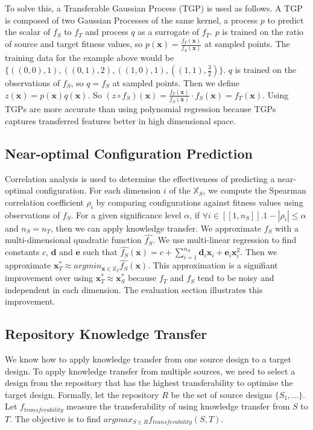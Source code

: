 \documentclass[10pt,a4paper]{article}
\newcommand{\dsb}[1]{[\![#1]\!]}
\begin{document}
To solve this, a Transferable Gaussian Process (TGP) is used as follows. A TGP is composed of two Gaussian Processes of the same kernel, a process $p$ to predict the scalar of $f_S$ to $f_T$ and process $q$ as a surrogate of $f_T$. $p$ is trained on the ratio of source and target fitness values, so $p(\mathbf{x})=\frac{f_T(\mathbf{x})}{f_S(\mathbf{x})}$ at sampled points. The training data for the example above would be $\{((0,0),1),((0,1),2),((1,0),1),\allowbreak((1,1),\frac{3}{2})\}$. $q$ is trained on the observations of $f_S$, so $q=f_S$ at sampled points. Then we define $z(\mathbf{x})=p(\mathbf{x})q(\mathbf{x})$. So $(z\circ f_S)(\mathbf{x})=\frac{f_T(\mathbf{x})}{f_S(\mathbf{x})}\cdot f_S(\mathbf{x})=f_T(\mathbf{x})$. Using TGPs are more accurate than using polynomial regression because TGPs captures transferred features better in high dimensional space.

\subsection{Near-optimal Configuration Prediction}
Correlation analysis is used to determine the effectiveness of predicting a near-optimal configuration. For each dimension $i$ of the $\mathbb{X}_S$, we compute the Spearman correlation coefficient $\rho_i$ by comparing configurations against fitness values using observations of $f_S$. For a given significance level $\alpha$, if $\forall i\in\dsb{1,n_S}.1-|\rho_i|\le\alpha$ and $n_S=n_T$, then we can apply knowledge transfer. We approximate $f_S$ with a multi-dimensional quadratic function $\hat{f_S}$\cite{Xi2004}. We use multi-linear regression to find constants $c$, $\mathbf{d}$ and $\mathbf{e}$ such that $\hat{f_S}(\mathbf{x})=c+\sum_{i=1}^{n_S}\mathbf{d}_i \mathbf{x}_i+\mathbf{e}_i \mathbf{x}_i^2$. Then we approximate $\mathbf{x}_T^*\approx argmin_{\mathbf{x}\in\mathbb{X}_T}\hat{f_S}(\mathbf{x})$. This approximation is a signifiant improvement over using $\mathbf{x}_T^*\approx\mathbf{x}_S^*$ because $f_T$ and $f_S$ tend to be noisy and independent in each dimension. The evaluation section illustrates this improvement.

\subsection{Repository Knowledge Transfer}

We know how to apply knowledge transfer from one source design to a target design. To apply knowledge transfer from multiple sources, we need to select a design from the repository that has the highest transferability to optimise the target design. Formally, let the repository $R$ be the set of source designs $\{S_1,...\}$. Let $f_{transferability}$ measure the transferability of using knowledge transfer from $S$ to $T$. The objective is to find $argmax_{S\in R}f_{transferability}(S,T)$.
\end{document}
